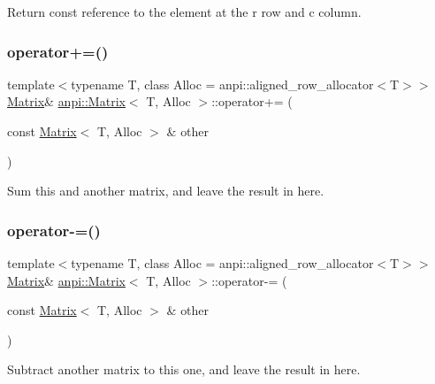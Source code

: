 Return const reference to the element at the r row and c column. 

\mbox{\label{classanpi_1_1Matrix_a41117c04ff2155dbf8c7af63dd82c245}} 
\subsubsection{\texorpdfstring{operator+=()}{operator+=()}}
{\footnotesize\ttfamily template$<$typename T, class Alloc = anpi\+::aligned\+\_\+row\+\_\+allocator$<$\+T$>$$>$ \\
\hyperlink{classanpi_1_1Matrix}{Matrix}\& \hyperlink{classanpi_1_1Matrix}{anpi\+::\+Matrix}$<$ T, Alloc $>$\+::operator+= (\begin{DoxyParamCaption}\item[{const \hyperlink{classanpi_1_1Matrix}{Matrix}$<$ T, Alloc $>$ \&}]{other }\end{DoxyParamCaption})}



Sum this and another matrix, and leave the result in here. 

\mbox{\label{classanpi_1_1Matrix_aedd6690382a1f26e2300ba25bb389b8b}} 
\subsubsection{\texorpdfstring{operator-\/=()}{operator-=()}}
{\footnotesize\ttfamily template$<$typename T, class Alloc = anpi\+::aligned\+\_\+row\+\_\+allocator$<$\+T$>$$>$ \\
\hyperlink{classanpi_1_1Matrix}{Matrix}\& \hyperlink{classanpi_1_1Matrix}{anpi\+::\+Matrix}$<$ T, Alloc $>$\+::operator-\/= (\begin{DoxyParamCaption}\item[{const \hyperlink{classanpi_1_1Matrix}{Matrix}$<$ T, Alloc $>$ \&}]{other }\end{DoxyParamCaption})}



Subtract another matrix to this one, and leave the result in here. 

\mbox{\label{classanpi_1_1Matrix_a94adb04f158cd8045eaef69fa47effc6}} 
